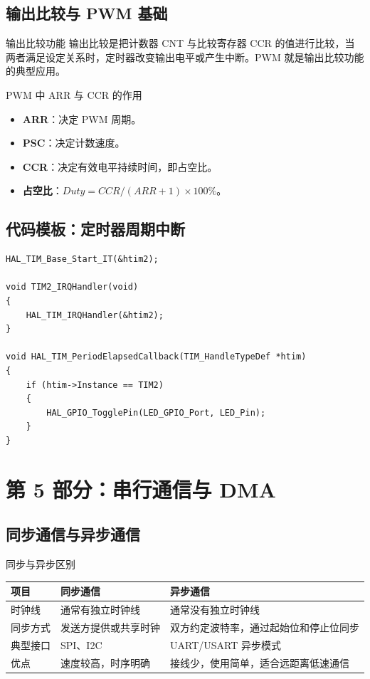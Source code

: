 \documentclass[UTF8,fontset=none,12pt]{ctexart}
\begin{document}
\subsection{输出比较与 PWM 基础}
\begin{pointbox}{输出比较功能}
输出比较是把计数器 CNT 与比较寄存器 CCR 的值进行比较，当两者满足设定关系时，定时器改变输出电平或产生中断。PWM 就是输出比较功能的典型应用。
\end{pointbox}

\begin{pointbox}{PWM 中 ARR 与 CCR 的作用}
\begin{itemize}
  \item \textbf{ARR}：决定 PWM 周期。
  \item \textbf{PSC}：决定计数速度。
  \item \textbf{CCR}：决定有效电平持续时间，即占空比。
  \item \textbf{占空比}：$Duty=CCR/(ARR+1)\times100\%$。
\end{itemize}
\end{pointbox}

\subsection{代码模板：定时器周期中断}
\begin{lstlisting}[style=cstyle]
HAL_TIM_Base_Start_IT(&htim2);

void TIM2_IRQHandler(void)
{
    HAL_TIM_IRQHandler(&htim2);
}

void HAL_TIM_PeriodElapsedCallback(TIM_HandleTypeDef *htim)
{
    if (htim->Instance == TIM2)
    {
        HAL_GPIO_TogglePin(LED_GPIO_Port, LED_Pin);
    }
}
\end{lstlisting}

\section{第 5 部分：串行通信与 DMA}

\subsection{同步通信与异步通信}
\begin{pointbox}{同步与异步区别}
\begin{tabularx}{\linewidth}{@{}p{3cm}p{5.5cm}Y@{}}
\toprule
\textbf{项目} & \textbf{同步通信} & \textbf{异步通信} \\
\midrule
时钟线 & 通常有独立时钟线 & 通常没有独立时钟线 \\
同步方式 & 发送方提供或共享时钟 & 双方约定波特率，通过起始位和停止位同步 \\
典型接口 & SPI、I2C & UART/USART 异步模式 \\
优点 & 速度较高，时序明确 & 接线少，使用简单，适合远距离低速通信 \\
\bottomrule
\end{tabularx}
\end{pointbox}
\end{document}
